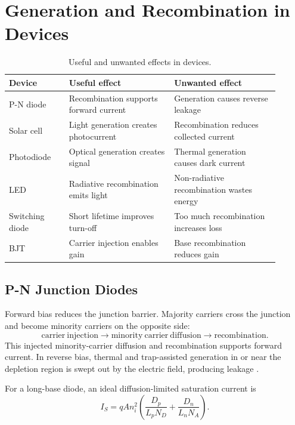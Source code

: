 \documentclass[11pt,a4paper]{article}
\newcommand{\nint}{n_i}
\begin{document}
\section{Generation and Recombination in Devices}

\begin{table}[h]
\centering
\caption{Useful and unwanted effects in devices.}
\begin{tabular}{p{0.2\linewidth}p{0.35\linewidth}p{0.35\linewidth}}
\toprule
Device & Useful effect & Unwanted effect\\
\midrule
P-N diode & Recombination supports forward current & Generation causes reverse leakage\\
Solar cell & Light generation creates photocurrent & Recombination reduces collected current\\
Photodiode & Optical generation creates signal & Thermal generation causes dark current\\
LED & Radiative recombination emits light & Non-radiative recombination wastes energy\\
Switching diode & Short lifetime improves turn-off & Too much recombination increases loss\\
BJT & Carrier injection enables gain & Base recombination reduces gain\\
\bottomrule
\end{tabular}
\end{table}

\subsection{P-N Junction Diodes}

Forward bias reduces the junction barrier. Majority carriers cross the junction and become minority carriers on the opposite side:
\begin{equation}
  \mathrm{carrier\ injection}\rightarrow
  \mathrm{minority\ carrier\ diffusion}\rightarrow
  \mathrm{recombination}.
\end{equation}
This injected minority-carrier diffusion and recombination supports forward current. In reverse bias, thermal and trap-assisted generation in or near the depletion region is swept out by the electric field, producing leakage \cite{mit6012,tugraz_diode}.

For a long-base diode, an ideal diffusion-limited saturation current is
\begin{equation}
  I_S=qA\nint^2\left(\frac{D_p}{L_pN_D}+\frac{D_n}{L_nN_A}\right).
\end{equation}
\end{document}
